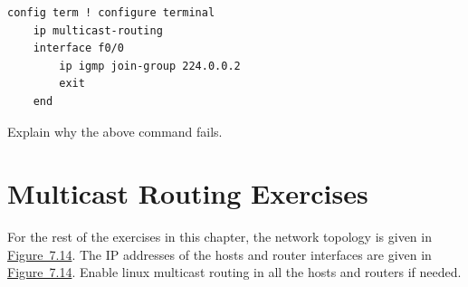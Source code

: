 \documentclass{../UTNetLab}
\begin{document}
\begin{lstlisting}[language={cisco}]
config term ! configure terminal
    ip multicast-routing
    interface f0/0
        ip igmp join-group 224.0.0.2
        exit
    end
\end{lstlisting}

\begin{report}
    \item Explain why the above command fails.
\end{report}

\part{Multicast Routing Exercises}\label{sec:multicast-routing}
For the rest of the exercises in this chapter, the network topology is given in \hyperref[fig:7.14]{Figure~7.14}.
The IP addresses of the hosts and router interfaces are given in \hyperref[fig:7.14]{Figure~7.14}.
Enable linux multicast routing in all the hosts and routers if needed.
\end{document}
